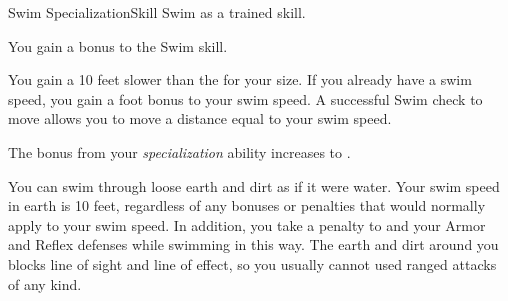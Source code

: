   \begin{feat}{Swim Specialization}{Skill}
    \featpre Swim as a trained skill.

     You gain a  bonus to the Swim skill.

     You gain a  10 feet slower than the  for your size.
    If you already have a swim speed, you gain a  foot bonus to your swim speed.
    A successful Swim check to move allows you to move a distance equal to your swim speed.

     The bonus from your \textit{specialization} ability increases to .

     You can swim through loose earth and dirt as if it were water.
    Your swim speed in earth is 10 feet, regardless of any bonuses or penalties that would normally apply to your swim speed.
    In addition, you take a  penalty to  and your Armor and Reflex defenses while swimming in this way.
    The earth and dirt around you blocks line of sight and line of effect, so you usually cannot used ranged attacks of any kind.
  \end{feat}

